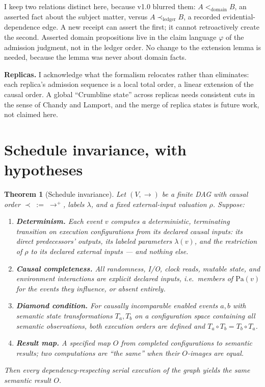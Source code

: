 \documentclass[11pt]{article}
\newtheorem{theorem}{Theorem}
\begin{document}
I keep two relations distinct here, because v1.0 blurred them: $A <_{\mathrm{domain}} B$, an asserted fact about the subject matter, versus $A \prec_{\mathrm{ledger}} B$, a recorded evidential-dependence edge. A new receipt can assert the first; it cannot retroactively create the second. Asserted domain propositions live in the claim language $\varphi$ of the admission judgment, not in the ledger order. No change to the extension lemma is needed, because the lemma was never about domain facts.

\textbf{Replicas.} I acknowledge what the formalism relocates rather than eliminates: each replica's admission sequence is a local total order, a linear extension of the causal order. A global ``Crumbline state'' across replicas needs consistent cuts in the sense of Chandy and Lamport, and the merge of replica states is future work, not claimed here.

\section{Schedule invariance, with hypotheses}

\begin{theorem}[Schedule invariance]
\label{thm:schedule}
Let $(V, \to)$ be a finite DAG with causal order $\prec\; :=\; \to^+$, labels $\lambda$, and a fixed external-input valuation $\rho$. Suppose:
\begin{enumerate}[leftmargin=*]
\item \textbf{Determinism.} Each event $v$ computes a deterministic, terminating transition on execution configurations from its declared causal inputs: its direct predecessors' outputs, its labeled parameters $\lambda(v)$, and the restriction of $\rho$ to its declared external inputs --- and nothing else.
\item \textbf{Causal completeness.} All randomness, I/O, clock reads, mutable state, and environment interactions are explicit declared inputs, i.e.\ members of $\mathrm{Pa}(v)$ for the events they influence, or absent entirely.
\item \textbf{Diamond condition.} For causally incomparable enabled events $a, b$ with semantic state transformations $T_a, T_b$ on a configuration space containing all semantic observations, both execution orders are defined and $T_a \circ T_b = T_b \circ T_a$.
\item \textbf{Result map.} A specified map $O$ from completed configurations to semantic results; two computations are ``the same'' when their $O$-images are equal.
\end{enumerate}
Then every dependency-respecting serial execution of the graph yields the same semantic result $O$.
\end{theorem}
\end{document}

